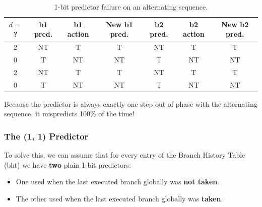 \begin{table}[htpb]
    \centering
    \renewcommand{\arraystretch}{1.2}
    \begin{tabular}{c c c c | c c c}
        \textbf{\(d=\)?} & \textbf{b1 pred.} & \textbf{b1 action} & \textbf{New b1 pred.} & \textbf{b2 pred.} & \textbf{b2 action} & \textbf{New b2 pred.} \\
        \hline
        2 & NT & T  & T  & NT & T  & T \\
        0 & T  & NT & NT & T  & NT & NT \\
        2 & NT & T  & T  & NT & T  & T \\
        0 & T  & NT & NT & T  & NT & NT \\
        \hline
    \end{tabular}
    \caption{1-bit predictor failure on an alternating sequence.}
    \label{tab:1bit-failure}
\end{table}

Because the predictor is always exactly one step out of phase with the alternating sequence, it mispredicts 100\% of the time!

\subsubsection{The (1, 1) Predictor}
To solve this, we can assume that for every entry of the Branch History Table (\gls{bht}) we have \textbf{two} plain 1-bit predictors:
\begin{itemize}
    \item One used when the last executed branch globally was \textbf{not taken}.
    \item The other used when the last executed branch globally was \textbf{taken}.
\end{itemize}

